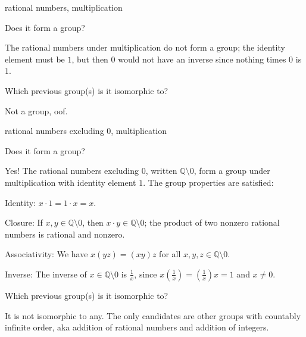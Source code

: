 \documentclass[../key.tex]{subfiles}
\begin{document}
\begin{inner_problem}
\item rational numbers, multiplication
\end{inner_problem}

\begin{iinner_problem}[start=1]
\item Does it form a group?
\end{iinner_problem}

\noindent The rational numbers under multiplication do not form a group; the identity element must be $1$, but then $0$ would not have an inverse since nothing times $0$ is $1$.

\begin{iinner_problem}
\item Which previous group(s) is it isomorphic to?
\end{iinner_problem}

\noindent Not a group, oof.

\begin{inner_problem}
\item rational numbers excluding $0$, multiplication
\end{inner_problem}

\begin{iinner_problem}[start=1]
\item Does it form a group?
\end{iinner_problem}

\noindent Yes! The rational numbers excluding $0$, written $\mathbb{Q} \setminus {0}$, form a group under multiplication with identity element $1$. The group properties are satisfied:

Identity: $x\cdot 1=1\cdot x=x$.

Closure: If $x,y\in \mathbb{Q} \setminus {0}$, then $x\cdot y\in \mathbb{Q} \setminus {0}$; the product of two nonzero rational numbers is rational and nonzero.

Associativity: We have $x(yz)=(xy)z$ for all $x,y,z \in \mathbb{Q} \setminus {0}$.

Inverse: The inverse of $x\in \mathbb{Q} \setminus {0}$ is $\frac{1}{x}$, since $x\left(\frac{1}{x}\right)=\left(\frac{1}{x}\right)x=1$ and $x\neq 0$.

\begin{iinner_problem}
\item Which previous group(s) is it isomorphic to?
\end{iinner_problem}

\noindent It is not isomorphic to any. The only candidates are other groups with countably infinite order, aka addition of rational numbers and addition of integers.
\end{document}
